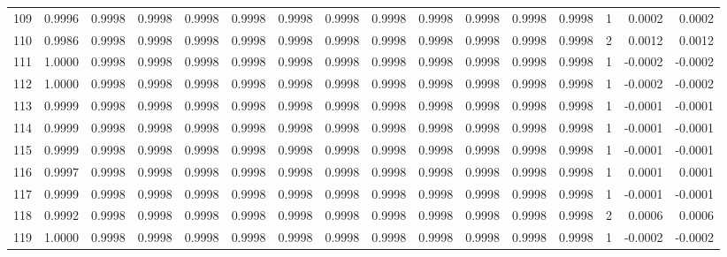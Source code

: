 \begin{tabular}{lrrrrrrrrrrrrrrr}
109 &      0.9996 &  0.9998 &  0.9998 &  0.9998 &  0.9998 &  0.9998 &  0.9998 &  0.9998 &  0.9998 &  0.9998 &   0.9998 &     0.9998 &      1 &                    0.0002 &                     0.0002 \\
110 &      0.9986 &  0.9998 &  0.9998 &  0.9998 &  0.9998 &  0.9998 &  0.9998 &  0.9998 &  0.9998 &  0.9998 &   0.9998 &     0.9998 &      2 &                    0.0012 &                     0.0012 \\
111 &      1.0000 &  0.9998 &  0.9998 &  0.9998 &  0.9998 &  0.9998 &  0.9998 &  0.9998 &  0.9998 &  0.9998 &   0.9998 &     0.9998 &      1 &                   -0.0002 &                    -0.0002 \\
112 &      1.0000 &  0.9998 &  0.9998 &  0.9998 &  0.9998 &  0.9998 &  0.9998 &  0.9998 &  0.9998 &  0.9998 &   0.9998 &     0.9998 &      1 &                   -0.0002 &                    -0.0002 \\
113 &      0.9999 &  0.9998 &  0.9998 &  0.9998 &  0.9998 &  0.9998 &  0.9998 &  0.9998 &  0.9998 &  0.9998 &   0.9998 &     0.9998 &      1 &                   -0.0001 &                    -0.0001 \\
114 &      0.9999 &  0.9998 &  0.9998 &  0.9998 &  0.9998 &  0.9998 &  0.9998 &  0.9998 &  0.9998 &  0.9998 &   0.9998 &     0.9998 &      1 &                   -0.0001 &                    -0.0001 \\
115 &      0.9999 &  0.9998 &  0.9998 &  0.9998 &  0.9998 &  0.9998 &  0.9998 &  0.9998 &  0.9998 &  0.9998 &   0.9998 &     0.9998 &      1 &                   -0.0001 &                    -0.0001 \\
116 &      0.9997 &  0.9998 &  0.9998 &  0.9998 &  0.9998 &  0.9998 &  0.9998 &  0.9998 &  0.9998 &  0.9998 &   0.9998 &     0.9998 &      1 &                    0.0001 &                     0.0001 \\
117 &      0.9999 &  0.9998 &  0.9998 &  0.9998 &  0.9998 &  0.9998 &  0.9998 &  0.9998 &  0.9998 &  0.9998 &   0.9998 &     0.9998 &      1 &                   -0.0001 &                    -0.0001 \\
118 &      0.9992 &  0.9998 &  0.9998 &  0.9998 &  0.9998 &  0.9998 &  0.9998 &  0.9998 &  0.9998 &  0.9998 &   0.9998 &     0.9998 &      2 &                    0.0006 &                     0.0006 \\
119 &      1.0000 &  0.9998 &  0.9998 &  0.9998 &  0.9998 &  0.9998 &  0.9998 &  0.9998 &  0.9998 &  0.9998 &   0.9998 &     0.9998 &      1 &                   -0.0002 &                    -0.0002 \\

\end{tabular}
